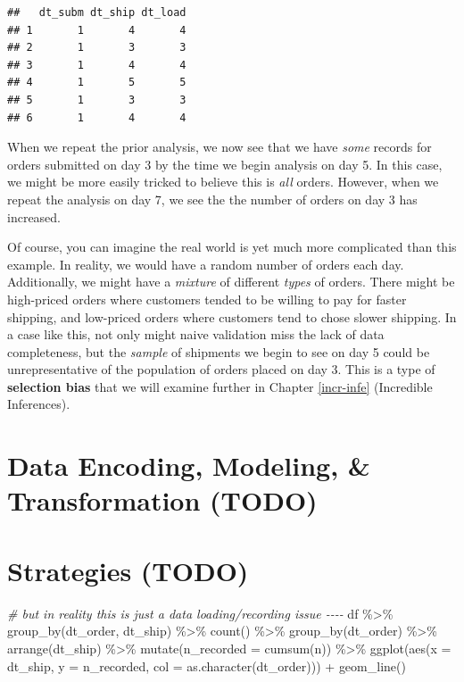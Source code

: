 \documentclass[
]{krantz}
\makeatletter
\newenvironment{Shaded}{\begin{snugshade}}{\end{snugshade}}
\newcommand{\AttributeTok}[1]{\textcolor[rgb]{0.61,0.61,0.61}{#1}}
\newcommand{\CommentTok}[1]{\textcolor[rgb]{0.37,0.37,0.37}{\textit{#1}}}
\newcommand{\FunctionTok}[1]{\textcolor[rgb]{0,0,0}{#1}}
\newcommand{\NormalTok}[1]{#1}
\newcommand{\SpecialCharTok}[1]{\textcolor[rgb]{0,0,0}{#1}}
\newenvironment{kframe}{%
\medskip{}
\setlength{\fboxsep}{.8em}
 \def\at@end@of@kframe{}%
 \ifinner\ifhmode%
  \def\at@end@of@kframe{\end{minipage}}%
  \begin{minipage}{\columnwidth}%
 \fi\fi%
 \def\FrameCommand##1{\hskip\@totalleftmargin \hskip-\fboxsep
 \colorbox{shadecolor}{##1}\hskip-\fboxsep
     \hskip-\linewidth \hskip-\@totalleftmargin \hskip\columnwidth}%
 \MakeFramed {\advance\hsize-\width
   \@totalleftmargin\z@ \linewidth\hsize
   \@setminipage}}%
 {\par\unskip\endMakeFramed%
 \at@end@of@kframe}
\renewenvironment{Shaded}{\begin{kframe}}{\end{kframe}}
\makeatother
\begin{document}
\begin{verbatim}
##   dt_subm dt_ship dt_load
## 1       1       4       4
## 2       1       3       3
## 3       1       4       4
## 4       1       5       5
## 5       1       3       3
## 6       1       4       4
\end{verbatim}

When we repeat the prior analysis, we now see that we have \emph{some} records for orders submitted on day 3 by the time we begin analysis on day 5.
In this case, we might be more easily tricked to believe this is \emph{all} orders.
However, when we repeat the analysis on day 7, we see the the number of orders on day 3 has increased.

Of course, you can imagine the real world is yet much more complicated than this example.
In reality, we would have a random number of orders each day.
Additionally, we might have a \emph{mixture} of different \emph{types} of orders.
There might be high-priced orders where customers tended to be willing to pay for faster shipping,
and low-priced orders where customers tend to chose slower shipping.
In a case like this, not only might naive validation miss the lack of data completeness, but the \emph{sample} of shipments we begin to see on day 5 could be unrepresentative of the population of orders placed on day 3.
This is a type of \textbf{selection bias} that we will examine further in Chapter \ref{incr-infe} (Incredible Inferences).

\hypertarget{data-encoding-modeling-transformation-todo}{%
\section{Data Encoding, Modeling, \& Transformation (TODO)}\label{data-encoding-modeling-transformation-todo}}

\hypertarget{strategies-todo}{%
\section{Strategies (TODO)}\label{strategies-todo}}

\begin{Shaded}
\begin{Highlighting}[]
\CommentTok{\# but in reality this is just a data loading/recording issue {-}{-}{-}{-}}
\NormalTok{df }\SpecialCharTok{\%\textgreater{}\%}
  \FunctionTok{group\_by}\NormalTok{(dt\_order, dt\_ship) }\SpecialCharTok{\%\textgreater{}\%}
  \FunctionTok{count}\NormalTok{() }\SpecialCharTok{\%\textgreater{}\%}
  \FunctionTok{group\_by}\NormalTok{(dt\_order) }\SpecialCharTok{\%\textgreater{}\%}
  \FunctionTok{arrange}\NormalTok{(dt\_ship) }\SpecialCharTok{\%\textgreater{}\%}
  \FunctionTok{mutate}\NormalTok{(}\AttributeTok{n\_recorded =} \FunctionTok{cumsum}\NormalTok{(n)) }\SpecialCharTok{\%\textgreater{}\%}
  \FunctionTok{ggplot}\NormalTok{(}\FunctionTok{aes}\NormalTok{(}\AttributeTok{x =}\NormalTok{ dt\_ship, }\AttributeTok{y =}\NormalTok{ n\_recorded, }\AttributeTok{col =} \FunctionTok{as.character}\NormalTok{(dt\_order))) }\SpecialCharTok{+} \FunctionTok{geom\_line}\NormalTok{()}
\end{Highlighting}
\end{Shaded}
\end{document}
